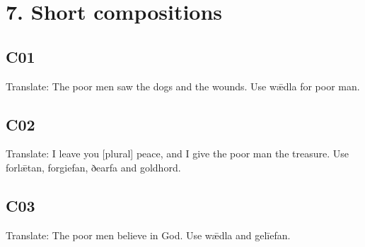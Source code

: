 \section*{7. Short compositions}

\par\begin{minipage}{\linewidth}\raggedright
\subsection*{C01}

Translate: The poor men saw the dogs and the wounds. Use wǣdla for poor man.

\end{minipage}\par\addvspace{4pt}

\par\begin{minipage}{\linewidth}\raggedright
\subsection*{C02}

Translate: I leave you [plural] peace, and I give the poor man the treasure. Use forlǣtan, forgiefan, ðearfa and goldhord.

\end{minipage}\par\addvspace{4pt}

\par\begin{minipage}{\linewidth}\raggedright
\subsection*{C03}

Translate: The poor men believe in God. Use wǣdla and gelīefan.

\end{minipage}\par\addvspace{4pt}

